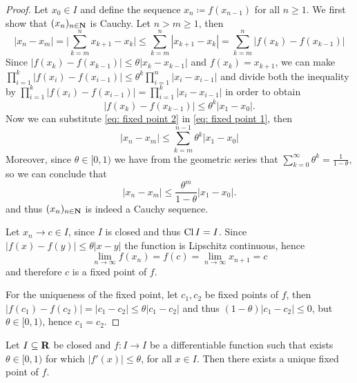 \begin{proof}
    Let \(x_0 \in I\) and define the sequence \(x_n \coloneq f(x_{n-1})\) for all \(n
    \geq 1\). We first show that \((x_n)_{n \in \mathbf{N}}\) is Cauchy. Let \(n >
    m \geq 1\), then
    \begin{equation}\label{eq: fixed point 1}
        |x_n - x_m| = \Big| \sum_{k=m}^n x_{k+1} - x_k \Big|
        \leq \sum_{k=m}^n |x_{k+1} - x_k| = \sum_{k=m}^n |f(x_k) - f(x_{k-1})|
    \end{equation}
    Since \(|f(x_k) - f(x_{k-1})| \leq \theta |x_k - x_{k-1}|\) and \(f(x_k) =
    x_{k+1}\), we can make  \(\prod_{i=1}^k |f(x_i) - f(x_{i-1})| \leq \theta^k
    \prod_{i=1}^n |x_i - x_{i-1}|\) and divide both the inequality by
    \(\prod_{i=1}^k |f(x_i) - f(x_{i-1})| = \prod_{i=1}^k |x_i - x_{i-1}|\) in
    order to obtain
    \begin{equation}\label{eq: fixed point 2}
        |f(x_k) - f(x_{k-1})| \leq \theta^k |x_1 - x_0|.
    \end{equation}
    Now we can substitute \cref{eq: fixed point 2} in \cref{eq: fixed point 1},
    then
    \[
        |x_n - x_m| \leq \sum_{k=m}^{n-1} \theta^k |x_1 - x_0|
    \]
    Moreover, since \(\theta \in [0, 1)\) we have from the geometric series that
    \(\sum_{k=0}^\infty \theta^k = \frac{1}{1-\theta}\), so we can conclude that
    \[
        |x_n - x_m| \leq \frac{\theta^m}{1 - \theta} |x_1 - x_0|.
    \]
    and thus \((x_n)_{n \in \mathbf{N}}\) is indeed a Cauchy sequence.

    Let \(x_n \to c \in I\), since \(I\) is closed and thus \(\operatorname{Cl} I = I\).
    Since \(|f(x) - f(y)| \leq \theta |x - y|\) the function is Lipschitz
    continuous, hence
    \[
        \lim_{n \to \infty} f(x_n) = f(c) = \lim_{n \to \infty} x_{n+1} = c
    \]
    and therefore \(c\) is a fixed point of \(f\).

    For the uniqueness of the fixed point, let \(c_1, c_2\) be fixed points of
    \(f\), then \(|f(c_1) - f(c_2)| = |c_1 - c_2| \leq \theta |c_1 - c_2|\) and
    thus \((1 - \theta)|c_1 - c_2| \leq 0\), but \(\theta \in [0, 1)\), hence
    \(c_1 = c_2\).
\end{proof}

\begin{corollary}
    Let \(I \subseteq \mathbf{R}\) be closed and \(f : I \to I\) be a
    differentiable function such that exists \(\theta \in [0, 1)\) for which
    \(|f'(x)| \leq \theta\), for all \(x \in I\). Then there exists a unique fixed
    point of \(f\).
\end{corollary}

